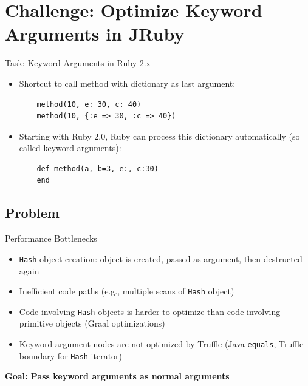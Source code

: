 \documentclass[xcolor=dvipsname,handout]{beamer} %
\begin{document}
\section{Challenge: Optimize Keyword Arguments in JRuby}

\begin{frame}[fragile]{Task: Keyword Arguments in Ruby 2.x}

\begin{itemize}
 \item Shortcut to call method with dictionary as last argument:
    \begin{lstlisting}
    method(10, e: 30, c: 40)
    method(10, {:e => 30, :c => 40})
    \end{lstlisting}
  \item Starting with Ruby 2.0, Ruby can process this dictionary automatically (so called keyword arguments):
    \begin{lstlisting}
    def method(a, b=3, e:, c:30)
    end
    \end{lstlisting}
\end{itemize}
\end{frame}


\subsection{Problem}

\begin{frame}{Performance Bottlenecks}
\begin{itemize}
    \item \lstinline{Hash} object creation: object is created, passed as argument, then destructed again
    \item Inefficient code paths (e.g., multiple scans of \lstinline{Hash} object)
    \item Code involving \lstinline{Hash} objects is harder to optimize than code involving primitive objects (Graal optimizations)
    \item Keyword argument nodes are not optimized by Truffle (Java \lstinline{equals}, Truffle boundary for \lstinline{Hash} iterator)
\end{itemize}

\begin{table}
    \centering
\textbf{Goal: Pass keyword arguments as normal arguments}
\end{table}
\end{frame}
\end{document}
